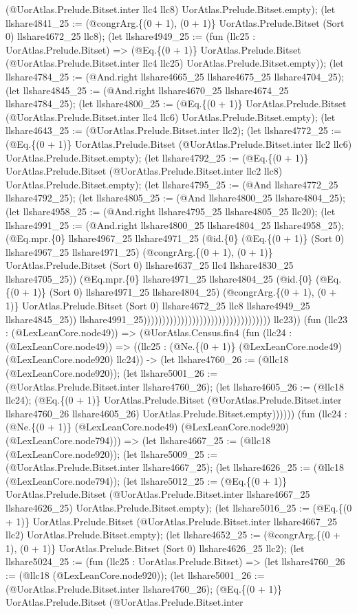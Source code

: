 \documentclass[11pt]{article}
\begin{document}
(@UorAtlas.Prelude.Bitset.inter llc4 llc8) UorAtlas.Prelude.Bitset.empty); (let llshare4841\_25 := (@congrArg.\{(0 + 1), (0 + 1)\} UorAtlas.Prelude.Bitset (Sort 0) llshare4672\_25 llc8); (let llshare4949\_25 := (fun (llc25 : UorAtlas.Prelude.Bitset) => (@Eq.\{(0 + 1)\} UorAtlas.Prelude.Bitset (@UorAtlas.Prelude.Bitset.inter llc4 llc25) UorAtlas.Prelude.Bitset.empty)); (let llshare4784\_25 := (@And.right llshare4665\_25 llshare4675\_25 llshare4704\_25); (let llshare4845\_25 := (@And.right llshare4670\_25 llshare4674\_25 llshare4784\_25); (let llshare4800\_25 := (@Eq.\{(0 + 1)\} UorAtlas.Prelude.Bitset (@UorAtlas.Prelude.Bitset.inter llc4 llc6) UorAtlas.Prelude.Bitset.empty); (let llshare4643\_25 := (@UorAtlas.Prelude.Bitset.inter llc2); (let llshare4772\_25 := (@Eq.\{(0 + 1)\} UorAtlas.Prelude.Bitset (@UorAtlas.Prelude.Bitset.inter llc2 llc6) UorAtlas.Prelude.Bitset.empty); (let llshare4792\_25 := (@Eq.\{(0 + 1)\} UorAtlas.Prelude.Bitset (@UorAtlas.Prelude.Bitset.inter llc2 llc8) UorAtlas.Prelude.Bitset.empty); (let llshare4795\_25 := (@And llshare4772\_25 llshare4792\_25); (let llshare4805\_25 := (@And llshare4800\_25 llshare4804\_25); (let llshare4958\_25 := (@And.right llshare4795\_25 llshare4805\_25 llc20); (let llshare4991\_25 := (@And.right llshare4800\_25 llshare4804\_25 llshare4958\_25); (@Eq.mpr.\{0\} llshare4967\_25 llshare4971\_25 (@id.\{0\} (@Eq.\{(0 + 1)\} (Sort 0) llshare4967\_25 llshare4971\_25) (@congrArg.\{(0 + 1), (0 + 1)\} UorAtlas.Prelude.Bitset (Sort 0) llshare4637\_25 llc4 llshare4830\_25 llshare4705\_25)) (@Eq.mpr.\{0\} llshare4971\_25 llshare4804\_25 (@id.\{0\} (@Eq.\{(0 + 1)\} (Sort 0) llshare4971\_25 llshare4804\_25) (@congrArg.\{(0 + 1), (0 + 1)\} UorAtlas.Prelude.Bitset (Sort 0) llshare4672\_25 llc8 llshare4949\_25 llshare4845\_25)) llshare4991\_25)))))))))))))))))))))))))))))))))) llc23)) (fun (llc23 : (@LexLeanCore.node49)) => (@UorAtlas.Census.fin4 (fun (llc24 : (@LexLeanCore.node49)) => ((llc25 : (@Ne.\{(0 + 1)\} (@LexLeanCore.node49) (@LexLeanCore.node920) llc24)) -> (let llshare4760\_26 := (@llc18 (@LexLeanCore.node920)); (let llshare5001\_26 := (@UorAtlas.Prelude.Bitset.inter llshare4760\_26); (let llshare4605\_26 := (@llc18 llc24); (@Eq.\{(0 + 1)\} UorAtlas.Prelude.Bitset (@UorAtlas.Prelude.Bitset.inter llshare4760\_26 llshare4605\_26) UorAtlas.Prelude.Bitset.empty)))))) (fun (llc24 : (@Ne.\{(0 + 1)\} (@LexLeanCore.node49) (@LexLeanCore.node920) (@LexLeanCore.node794))) => (let llshare4667\_25 := (@llc18 (@LexLeanCore.node920)); (let llshare5009\_25 := (@UorAtlas.Prelude.Bitset.inter llshare4667\_25); (let llshare4626\_25 := (@llc18 (@LexLeanCore.node794)); (let llshare5012\_25 := (@Eq.\{(0 + 1)\} UorAtlas.Prelude.Bitset (@UorAtlas.Prelude.Bitset.inter llshare4667\_25 llshare4626\_25) UorAtlas.Prelude.Bitset.empty); (let llshare5016\_25 := (@Eq.\{(0 + 1)\} UorAtlas.Prelude.Bitset (@UorAtlas.Prelude.Bitset.inter llshare4667\_25 llc2) UorAtlas.Prelude.Bitset.empty); (let llshare4652\_25 := (@congrArg.\{(0 + 1), (0 + 1)\} UorAtlas.Prelude.Bitset (Sort 0) llshare4626\_25 llc2); (let llshare5024\_25 := (fun (llc25 : UorAtlas.Prelude.Bitset) => (let llshare4760\_26 := (@llc18 (@LexLeanCore.node920)); (let llshare5001\_26 := (@UorAtlas.Prelude.Bitset.inter llshare4760\_26); (@Eq.\{(0 + 1)\} UorAtlas.Prelude.Bitset (@UorAtlas.Prelude.Bitset.inter 
\end{document}
